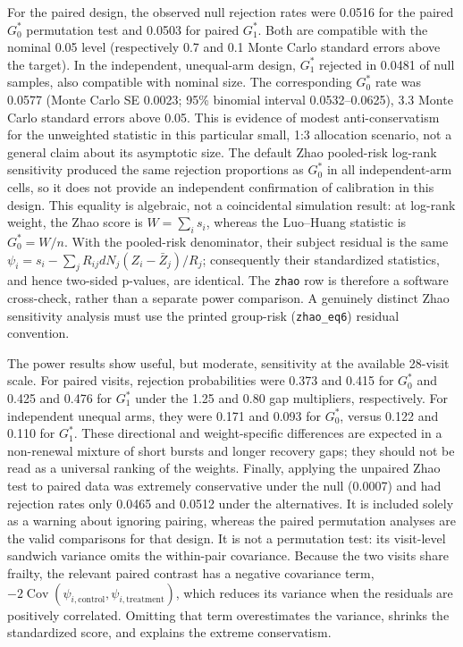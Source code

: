 \documentclass[
  12pt]{article}
\begin{document}
For the paired design, the observed null rejection rates were 0.0516 for
the paired \(G_0^*\) permutation test and 0.0503 for paired \(G_1^*\).
Both are compatible with the nominal 0.05 level (respectively 0.7 and
0.1 Monte Carlo standard errors above the target). In the independent,
unequal-arm design, \(G_1^*\) rejected in 0.0481 of null samples, also
compatible with nominal size. The corresponding \(G_0^*\) rate was
0.0577 (Monte Carlo SE 0.0023; 95\% binomial interval 0.0532--0.0625),
3.3 Monte Carlo standard errors above 0.05. This is evidence of modest
anti-conservatism for the unweighted statistic in this particular small,
1:3 allocation scenario, not a general claim about its asymptotic size.
The default Zhao pooled-risk log-rank sensitivity produced the same
rejection proportions as \(G_0^*\) in all independent-arm cells, so it
does not provide an independent confirmation of calibration in this
design. This equality is algebraic, not a coincidental simulation
result: at log-rank weight, the Zhao score is \(W=\sum_i s_i\), whereas
the Luo--Huang statistic is \(G_0^*=W/n\). With the pooled-risk
denominator, their subject residual is the same
\(\psi_i=s_i-\sum_j R_{ij}dN_j(Z_i-\bar Z_j)/R_j\); consequently their
standardized statistics, and hence two-sided p-values, are identical.
The \texttt{zhao} row is therefore a software cross-check, rather than a
separate power comparison. A genuinely distinct Zhao sensitivity
analysis must use the printed group-risk (\texttt{zhao\_eq6}) residual
convention.

The power results show useful, but moderate, sensitivity at the
available 28-visit scale. For paired visits, rejection probabilities
were 0.373 and 0.415 for \(G_0^*\) and 0.425 and 0.476 for \(G_1^*\)
under the 1.25 and 0.80 gap multipliers, respectively. For independent
unequal arms, they were 0.171 and 0.093 for \(G_0^*\), versus 0.122 and
0.110 for \(G_1^*\). These directional and weight-specific differences
are expected in a non-renewal mixture of short bursts and longer
recovery gaps; they should not be read as a universal ranking of the
weights. Finally, applying the unpaired Zhao test to paired data was
extremely conservative under the null (0.0007) and had rejection rates
only 0.0465 and 0.0512 under the alternatives. It is included solely as
a warning about ignoring pairing, whereas the paired permutation
analyses are the valid comparisons for that design. It is not a
permutation test: its visit-level sandwich variance omits the
within-pair covariance. Because the two visits share frailty, the
relevant paired contrast has a negative covariance term,
\(-2\operatorname{Cov}(\psi_{i,\mathrm{control}},\psi_{i,\mathrm{treatment}})\),
which reduces its variance when the residuals are positively correlated.
Omitting that term overestimates the variance, shrinks the standardized
score, and explains the extreme conservatism.
\end{document}
